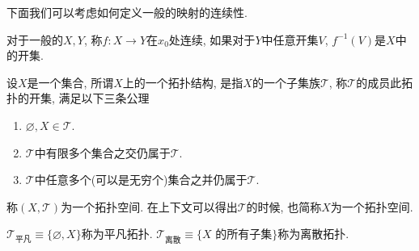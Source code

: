 下面我们可以考虑如何定义一般的映射的连续性.
\begin{definition}
    对于一般的$X, Y$, 称$f\colon X \to Y$在$x_0$处连续, 如果对于$Y$中任意开集$V$, $f^{-1} \left( V \right) $是$X$中的开集.
\end{definition}

\begin{definition}
    设$X$是一个集合, 所谓$X$上的一个拓扑结构, 是指$X$的一个子集族$\mathscr{T}$, 称$\mathscr{T}$的成员此拓扑的开集, 满足以下三条公理
    \begin{enumerate}
        \item $\varnothing, X \in \mathscr{T}$.
        \item $\mathscr{T}$中有限多个集合之交仍属于$\mathscr{T}$.
        \item $\mathscr{T}$中任意多个(可以是无穷个)集合之并仍属于$\mathscr{T}$.
    \end{enumerate}
    称$\left( X , \mathscr{T}\right) $为一个拓扑空间. 在上下文可以得出$\mathscr{T}$的时候, 也简称$X$为一个拓扑空间.
\end{definition}

\begin{example}
    $\mathscr{T}_{\text{平凡}} \equiv \{ \varnothing, X \}$称为平凡拓扑.
    $\mathscr{T}_{\text{离散}} \equiv \{ X \text{ 的所有子集} \} $称为离散拓扑.
\end{example}

